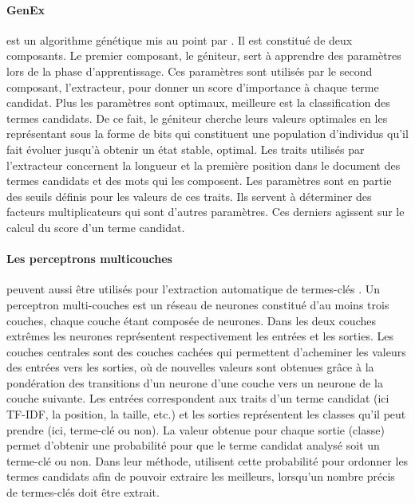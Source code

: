        \paragraph{GenEx}
          est un algorithme génétique mis au point par
          \citet{turney1999learningalgorithms}. Il est constitué de deux composants.
          Le premier composant, le géniteur, sert à apprendre des paramètres lors de
          la phase d'apprentissage. Ces paramètres sont utilisés par le second
          composant, l'extracteur, pour donner un score d'importance à chaque terme
          candidat. Plus les paramètres sont optimaux, meilleure est la
          classification des termes candidats. De ce fait, le géniteur cherche leurs valeurs
          optimales en les représentant sous la forme de bits qui constituent une
          population d'individus qu'il fait évoluer jusqu'à obtenir un état stable,
          optimal. Les traits utilisés par l'extracteur concernent la longueur et la
          première position dans le document des termes candidats et des mots qui
          les composent. Les paramètres sont en partie des seuils définis pour les
          valeurs de ces traits. Ils servent à déterminer des facteurs
          multiplicateurs qui sont d'autres paramètres. Ces derniers agissent sur le
          calcul du score d'un terme candidat.

        \paragraph{Les perceptrons multicouches}
          peuvent aussi être utilisés pour l'extraction automatique de termes-clés
          \citep{sarkar2010neuralnetwork}. Un perceptron multi-couches est un réseau
          de neurones constitué d'au moins trois couches, chaque couche étant
          composée de neurones. Dans les deux couches extrêmes les neurones
          représentent respectivement les entrées et les sorties. Les couches
          centrales sont des couches cachées qui permettent d'acheminer les valeurs
          des entrées vers les sorties, où de nouvelles valeurs sont obtenues grâce
          à la pondération des transitions d'un neurone d'une couche vers un neurone
          de la couche suivante. Les entrées correspondent aux traits d'un terme
          candidat (ici TF-IDF, la position, la taille, etc.) et les sorties
          représentent les classes qu'il peut prendre (ici, terme-clé ou non). La
          valeur obtenue pour chaque sortie (classe) permet d'obtenir une
          probabilité pour que le terme candidat analysé soit un terme-clé ou non.
          Dans leur méthode, \citet{sarkar2010neuralnetwork} utilisent cette
          probabilité pour ordonner les termes candidats afin de pouvoir extraire
          les meilleurs, lorsqu'un nombre précis de termes-clés doit être extrait.


